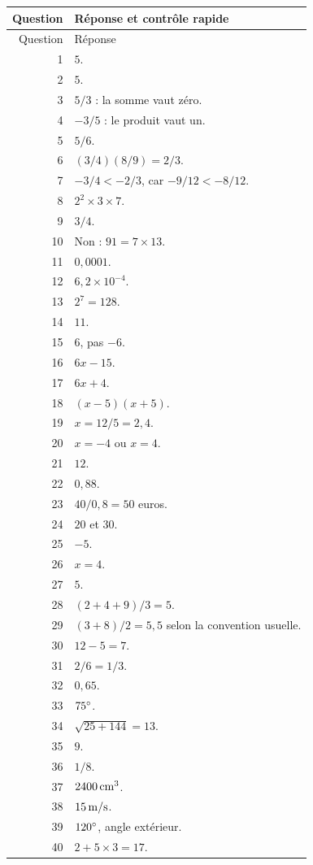 \documentclass[11pt,a4paper,oneside]{book}
\begin{document}
\begin{longtable}{r p{}}
\toprule Question & Réponse et contrôle rapide\\\midrule
\endfirsthead\toprule Question & Réponse\\\midrule\endhead
1 & $5$.\\
2 & $5$.\\
3 & $5/3$ : la somme vaut zéro.\\
4 & $-3/5$ : le produit vaut un.\\
5 & $5/6$.\\
6 & $(3/4)(8/9)=2/3$.\\
7 & $-3/4<-2/3$, car $-9/12<-8/12$.\\
8 & $2^2\times3\times7$.\\
9 & $3/4$.\\
10 & Non : $91=7\times13$.\\
11 & $0{,}0001$.\\
12 & $6{,}2\times10^{-4}$.\\
13 & $2^7=128$.\\
14 & $11$.\\
15 & $6$, pas $-6$.\\
16 & $6x-15$.\\
17 & $6x+4$.\\
18 & $(x-5)(x+5)$.\\
19 & $x=12/5=2{,}4$.\\
20 & $x=-4$ ou $x=4$.\\
21 & $12$.\\
22 & $0{,}88$.\\
23 & $40/0{,}8=50$ euros.\\
24 & $20$ et $30$.\\
25 & $-5$.\\
26 & $x=4$.\\
27 & $5$.\\
28 & $(2+4+9)/3=5$.\\
29 & $(3+8)/2=5{,}5$ selon la convention usuelle.\\
30 & $12-5=7$.\\
31 & $2/6=1/3$.\\
32 & $0{,}65$.\\
33 & $75^{\circ}$.\\
34 & $\sqrt{25+144}=13$.\\
35 & $9$.\\
36 & $1/8$.\\
37 & $2400\,\mathrm{cm^3}$.\\
38 & $15\,\mathrm{m/s}$.\\
39 & $120^{\circ}$, angle extérieur.\\
40 & $2+5\times3=17$.\\
\bottomrule
\end{longtable}
\end{document}
